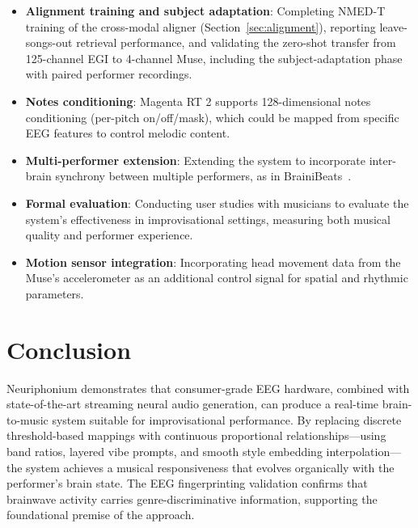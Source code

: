 \documentclass[manuscript,review,anonymous]{acmart}
\begin{document}
\begin{itemize}[nosep]
  \item \textbf{Alignment training and subject adaptation}: Completing NMED-T training of the cross-modal aligner (Section~\ref{sec:alignment}), reporting leave-songs-out retrieval performance, and validating the zero-shot transfer from 125-channel EGI to 4-channel Muse, including the subject-adaptation phase with paired performer recordings.
  \item \textbf{Notes conditioning}: Magenta RT 2 supports 128-dimensional notes conditioning (per-pitch on/off/mask), which could be mapped from specific EEG features to control melodic content.
  \item \textbf{Multi-performer extension}: Extending the system to incorporate inter-brain synchrony between multiple performers, as in BrainiBeats~\cite{brainibeats2023}.
  \item \textbf{Formal evaluation}: Conducting user studies with musicians to evaluate the system's effectiveness in improvisational settings, measuring both musical quality and performer experience.
  \item \textbf{Motion sensor integration}: Incorporating head movement data from the Muse's accelerometer as an additional control signal for spatial and rhythmic parameters.
\end{itemize}

\section{Conclusion}

Neuriphonium demonstrates that consumer-grade EEG hardware, combined with state-of-the-art streaming neural audio generation, can produce a real-time brain-to-music system suitable for improvisational performance. By replacing discrete threshold-based mappings with continuous proportional relationships---using band ratios, layered vibe prompts, and smooth style embedding interpolation---the system achieves a musical responsiveness that evolves organically with the performer's brain state. The EEG fingerprinting validation confirms that brainwave activity carries genre-discriminative information, supporting the foundational premise of the approach.
\end{document}
